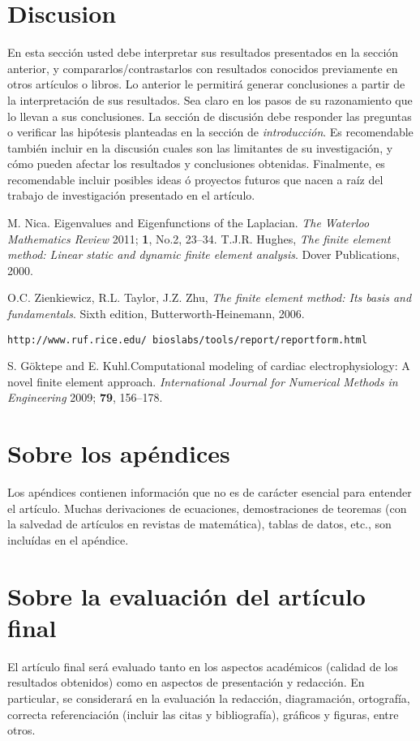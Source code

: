 \documentclass[12pt, letterpaper]{article}
\begin{document}
\section{Discusion}
En esta secci\'on usted debe interpretar sus resultados presentados en la secci\'on anterior, y compararlos/contrastarlos con resultados conocidos previamente en otros art\'iculos o libros. Lo anterior le permitir\'a generar conclusiones a partir de la interpretaci\'on de sus resultados. Sea claro en los pasos de su razonamiento que lo llevan a sus conclusiones. La secci\'on de discusi\'on debe responder las preguntas o verificar las hip\'otesis planteadas en la secci\'on de {\it introducci\'on}. Es recomendable tambi\'en incluir en la discusi\'on cuales son las limitantes de su investigaci\'on, y c\'omo pueden afectar los resultados y conclusiones obtenidas. Finalmente, es recomendable incluir posibles ideas \'o proyectos futuros que nacen a ra\'iz del trabajo de investigaci\'on presentado en el art\'iculo.


\begin{thebibliography}{10}

  M. Nica. Eigenvalues and Eigenfunctions of the Laplacian. \emph{The Waterloo Mathematics Review} 2011; {\bf 1}, No.2, 23--34.
  T.J.R. Hughes, \emph{The finite element method: Linear static and dynamic finite element analysis}. Dover Publications, 2000.
  
  O.C. Zienkiewicz, R.L. Taylor, J.Z. Zhu, \emph{The finite element method: Its basis and fundamentals}. Sixth edition, Butterworth-Heinemann, 2006.  

 {\tt http://www.ruf.rice.edu/~bioslabs/tools/report/reportform.html }

	S. G\"{o}ktepe and E. Kuhl.Computational modeling of cardiac electrophysiology: A novel finite element approach. \emph{International Journal for Numerical Methods in Engineering} 2009; {\bf 79}, 156--178.

\end{thebibliography}

\appendix

\section{Sobre los ap\'endices}
	Los ap\'endices contienen informaci\'on que no es de car\'acter esencial para entender el art\'iculo. Muchas derivaciones de ecuaciones, demostraciones de teoremas (con la salvedad de art\'iculos en revistas de matem\'atica), tablas de datos, etc., son inclu\'idas en el ap\'endice.
	
\section{Sobre la evaluaci\'on del art\'iculo final}
	El art\'iculo final ser\'a evaluado tanto en los aspectos acad\'emicos (calidad de los resultados obtenidos) como en aspectos de presentaci\'on y redacci\'on. En particular, se considerar\'a en la evaluaci\'on la redacci\'on, diagramaci\'on, ortograf\'ia, correcta referenciaci\'on (incluir las citas y bibliograf\'ia), gr\'aficos y figuras, entre otros.
\end{document}
